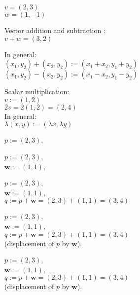 \documentclass[twocolumn,20pt,fleqn]{extarticle}
\newcommand{\sep}{\vspace{0.5cm}}
\theoremstyle{plain}
\theoremstyle{definition}
\theoremstyle{remark}
\begin{document}
\newpage

$v=(2,3)$\\
$w=(1,-1)$

\sep
Vector addition  and subtraction :\\
$v+w = (3,2)$



In general:\\
$(x_1,y_2) + (x_2,y_2) := (x_1 + x_2, y_1 + y_2)$\\
$(x_1,y_2) - (x_2,y_2) := (x_1 - x_2, y_1 - y_2)$




\sep
Scalar multiplication:\\
 $v:=(1,2)$\\
 $2v=2(1,2)=(2,4)$\\
In general:\\
$\lambda(x,y) := (\lambda x, \lambda y)$












\clearpage



$p := (2,3)$,


\clearpage



$p := (2,3)$,\\ $\mathbf{w} := (1,1)$,


\clearpage



$p := (2,3)$,\\ $\mathbf{w} := (1,1)$,\\ $q:=p + \mathbf{w} = (2,3) + (1,1) = (3,4)$ 


\clearpage



$p := (2,3)$,\\ $\mathbf{w} := (1,1)$,\\ $q:=p + \mathbf{w} = (2,3) + (1,1) = (3,4)$ \\ (displacement of $p$ by $\mathbf{w}$).




\clearpage



$p := (2,3)$,\\ $\mathbf{w} := (1,1)$,\\ $q:=p + \mathbf{w} = (2,3) + (1,1) = (3,4)$ \\ (displacement of $p$ by $\mathbf{w}$).
\end{document}
